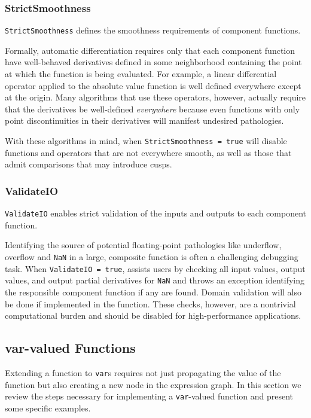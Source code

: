 \subsubsection{StrictSmoothness}

\verb|StrictSmoothness| defines the smoothness requirements of 
component functions.

Formally, automatic differentiation requires only that each component
function have well-behaved derivatives defined in some neighborhood
containing the point at which the function is being evaluated.  For
example, a linear differential operator applied to the absolute value
function is well defined everywhere except at the origin.  Many
algorithms that use these operators, however, actually require that
the derivatives be well-defined \textit{everywhere} because even 
functions with only point discontinuities in their derivatives will
manifest undesired pathologies.

With these algorithms in mind, when \verb|StrictSmoothness = true| 
\nomad will disable functions and operators that are not everywhere 
smooth, as well as those that admit comparisons that may introduce cusps.

\subsubsection{ValidateIO}

\verb|ValidateIO| enables strict validation of the inputs and outputs
to each component function.

Identifying the source of potential floating-point pathologies like
underflow, overflow and \verb|NaN| in a large, composite function
is often a challenging debugging task.  When \verb|ValidateIO = true|,
\nomad assists users by checking all input values, output values,
and output partial derivatives for \verb|NaN| and throws an
exception identifying the responsible component function if any
are found.  Domain validation will also be done if implemented in
the function.  These checks, however, are a nontrivial computational
burden and should be disabled for high-performance applications.

\subsection{var-valued Functions}

Extending a function to \verb|var|s requires not just propagating the
value of the function but also creating a new node in the expression
graph.  In this section we review the steps necessary for implementing
a \verb|var|-valued function and present some specific examples.

